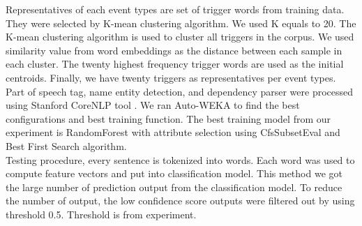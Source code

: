 Representatives of each event types are set of trigger words from training data. They were selected by K-mean clustering algorithm. We used K equals to 20. The K-mean clustering algorithm is used to cluster all triggers in the corpus. We used similarity value from word embeddings as the distance between each sample in each cluster. The twenty highest frequency trigger words are used as the initial centroids. Finally, we have twenty triggers as representatives per event types. Part of speech tag, name entity detection, and dependency parser were processed using Stanford CoreNLP tool \cite{manning2014stanford}. We ran Auto-WEKA \cite{thornton2013auto} to find the best configurations and best training function. The best training model from our experiment is RandomForest with attribute selection using CfsSubsetEval and Best First Search algorithm. \\
\indent Testing procedure, every sentence is tokenized into words. Each word was used to compute feature vectors and put into classification model. This method we got the large number of prediction output from the classification model. To reduce the number of output, the low confidence score outputs were filtered out by using threshold 0.5. Threshold is from experiment.
